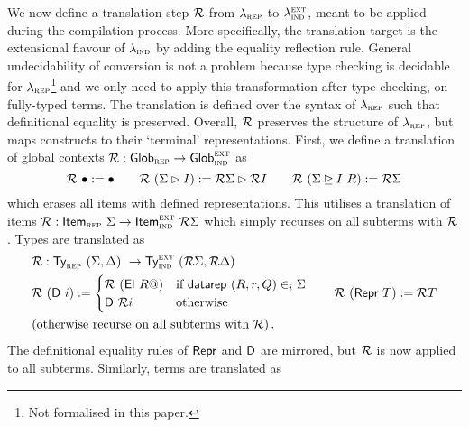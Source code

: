 We now define a translation step $\mathcal{R}$ from $\lambda_{\textsc{rep}}$ to
$\lambda_{\textsc{ind}}^{\textsc{ext}}$, meant to be applied during the compilation process.
More specifically, the translation target is the extensional flavour of
$\lambda_{\textsc{ind}}$ by adding the equality reflection rule. General undecidability of
conversion is not a problem because type checking is decidable for
$\lambda_{\textsc{rep}}$\footnote{Not formalised in this paper.} and we only need to apply this
transformation after type checking, on fully-typed terms. The translation is
defined over the syntax of $\lambda_{\textsc{rep}}$ \cite{Boulier2017-cm} such that
definitional equality is preserved. Overall, $\mathcal{R}$ preserves the structure of
$\lambda_{\textsc{rep}}$, but maps constructs to their `terminal' representations.
First, we define a translation of global contexts $\mathcal{R} : \textsf{Glob}_{\textsc{rep}} \to \textsf{Glob}_{\textsc{ind}}^\textsc{ext}$ as
\[
\mathcal{R}\ \bullet := \bullet \qquad \mathcal{R}\ (\Sigma \rhd I) := \mathcal{R} \Sigma \rhd \mathcal{R} I \qquad \mathcal{R}\ (\Sigma \unrhd I \ R) := \mathcal{R} \Sigma
\]
which erases all items with defined representations.
This utilises a translation of items $\mathcal{R} : \textsf{Item}_{\textsc{rep}}\ \Sigma \to \textsf{Item}_{\textsc{ind}}^\textsc{ext}\ \mathcal{R}
\Sigma$ which simply recurses on all subterms with $\mathcal{R}$.
Types are translated as
\begin{align*}
  & \mathcal{R} : \textsf{Ty}_{\textsc{rep}}\ (\Sigma, \Delta)\ \to \textsf{Ty}_{\textsc{ind}}^\textsc{ext}\ (\mathcal{R} \Sigma, \mathcal{R} \Delta) \\
  & \mathcal{R}\ (\textsf{D}\ i) := \begin{cases}
  \mathcal{R}\ (\textsf{El}\ R@) & \text{if $\textsf{datarep}\ (R, r, Q) \in_i \Sigma$} \\
  \textsf{D}\ \mathcal{R} i & \text{otherwise}
  \end{cases}  \qquad \mathcal{R}\ (\textsf{Repr}\ T) := \mathcal{R} T \\
  & \text{(otherwise recurse on all subterms with $\mathcal{R}$)} \,.
\end{align*}
The definitional equality rules of $\textsf{Repr}$ and $\textsf{D}$ are mirrored, but $\mathcal{R}$ is now applied
to all subterms.
Similarly, terms are translated as

